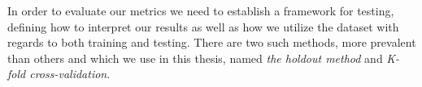 %

In order to evaluate our metrics we need to establish a framework for testing,
defining how to interpret our results as well as how we utilize the dataset
with regards to both training and testing. There are two such methods, more
prevalent than others and which we use in this thesis, named \textit{the
holdout method} and \textit{K-fold cross-validation}.

